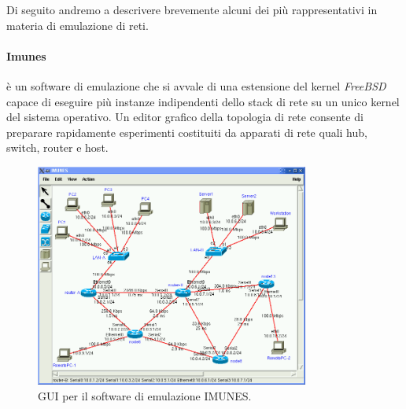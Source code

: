 Di seguito andremo a descrivere brevemente alcuni dei più rappresentativi in materia di emulazione di reti.

\paragraph{Imunes}\cite{OSSINI} è un software di emulazione che si avvale di una estensione del kernel \textit{FreeBSD} capace di eseguire più instanze indipendenti dello stack di rete su un unico kernel del sistema operativo. Un editor grafico della topologia di rete consente di preparare rapidamente esperimenti costituiti da apparati di rete quali hub, switch, router e host.
\begin{figure}[!ht]
	\centering
	\includegraphics[width=9cm]{images/imunes_gui_normal.png}
	\caption{GUI per il software di emulazione IMUNES.}
	\label{figura:imunes_gui}
\end{figure}

